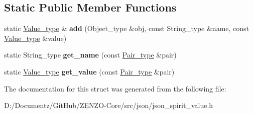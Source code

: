 \subsection*{Static Public Member Functions}
\begin{DoxyCompactItemize}
\item 
\mbox{\label{structjson__spirit_1_1_config__vector_ab93c926efca505403661a07c10257d17}} 
static \mbox{\hyperlink{classjson__spirit_1_1_value__impl}{Value\+\_\+type}} \& {\bfseries add} (Object\+\_\+type \&obj, const String\+\_\+type \&name, const \mbox{\hyperlink{classjson__spirit_1_1_value__impl}{Value\+\_\+type}} \&value)
\item 
\mbox{\label{structjson__spirit_1_1_config__vector_a3fa2b1ff15251bd8df760d3fdef54a4a}} 
static String\+\_\+type {\bfseries get\+\_\+name} (const \mbox{\hyperlink{structjson__spirit_1_1_pair__impl}{Pair\+\_\+type}} \&pair)
\item 
\mbox{\label{structjson__spirit_1_1_config__vector_a6dfb6f3fb008c7fe45f84803744586ab}} 
static \mbox{\hyperlink{classjson__spirit_1_1_value__impl}{Value\+\_\+type}} {\bfseries get\+\_\+value} (const \mbox{\hyperlink{structjson__spirit_1_1_pair__impl}{Pair\+\_\+type}} \&pair)
\end{DoxyCompactItemize}


The documentation for this struct was generated from the following file\+:\begin{DoxyCompactItemize}
\item 
D\+:/\+Documentz/\+Git\+Hub/\+Z\+E\+N\+Z\+O-\/\+Core/src/json/json\+\_\+spirit\+\_\+value.\+h\end{DoxyCompactItemize}

